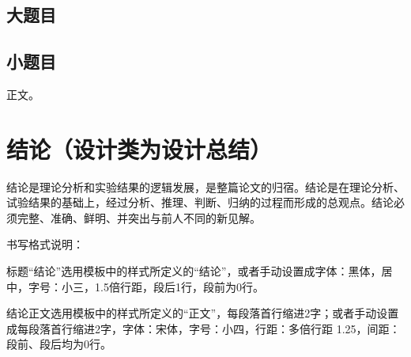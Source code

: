 	\begin{spacing}{1.7}
		\section{ {\heiti 大题目}} 
	\end{spacing}
	\begin{spacing}{1.3}
		\subsection{ {\heiti 小题目}}
	\end{spacing}
	\begin{spacing}{1.3}
		{\songti 正文。}
	\end{spacing}
	\section*{\fontsize{15}{22.5} {\heiti 结\quad\quad 论（设计类为设计总结）}}
	结论是理论分析和实验结果的逻辑发展，是整篇论文的归宿。结论是在理论分析、试验结果的基础上，经过分析、推理、判断、归纳的过程而形成的总观点。结论必须完整、准确、鲜明、并突出与前人不同的新见解。\par 
	书写格式说明：\par 
	标题“结论”选用模板中的样式所定义的“结论”，或者手动设置成字体：黑体，居中，字号：小三，1.5倍行距，段后1行，段前为0行。\par
	结论正文选用模板中的样式所定义的“正文”，每段落首行缩进2字；或者手动设置成每段落首行缩进2字，字体：宋体，字号：小四，行距：多倍行距 1.25，间距：段前、段后均为0行。\par 
	\newpage
	\renewcommand{\refname}{\fontsize{15}{22.5} \bf{\heiti 参\ 考\ 文\ 献}}
	
	
	\newpage
